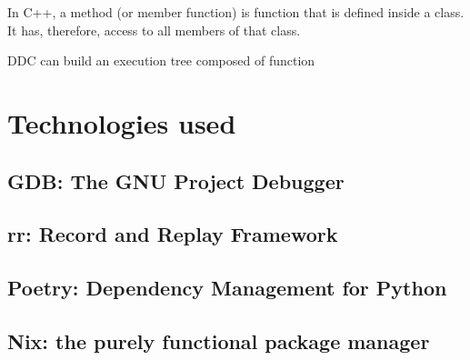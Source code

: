 In C++, a method (or member function) is function that is defined inside a class. It has, therefore, access to all members of that class.

DDC can build an execution tree composed of function
\section{Technologies used}
\subsection{GDB: The GNU Project Debugger}
\subsection{rr: Record and Replay Framework}
\subsection{Poetry: Dependency Management for Python}
\subsection{Nix: the purely functional package manager}